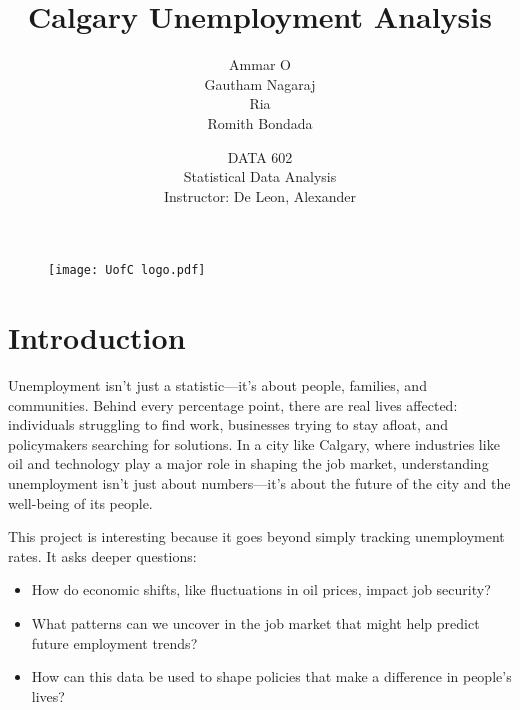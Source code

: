 \documentclass[11pt]{article}
\begin{document}
\title{
    \fontsize{24pt}{26pt}\textbf{Calgary Unemployment Analysis} 
}
\begin{figure}
    \centering
    \texttt{[image: UofC logo.pdf]} %
\end{figure}

\author{
    \vspace{0.5cm}
    \fontsize{20pt}{22pt}\selectfont Ammar O \\
    \vspace{0.5cm} %
    \fontsize{20pt}{22pt}\selectfont Gautham Nagaraj\\
    \vspace{0.5cm} %
    \fontsize{20pt}{22pt}\selectfont Ria  \\
    \vspace{0.5cm} %
    \fontsize{20pt}{22pt}\selectfont Romith Bondada
}
\date{
\vspace{0.5cm}
\fontsize{22pt}{24pt}\selectfont DATA 602\\
\vspace{0.25cm}
\fontsize{22pt}{24pt}\selectfont Statistical Data Analysis\\
\vspace{0.25cm}
\fontsize{22pt}{24pt}\selectfont Instructor: De Leon, Alexander
}

\maketitle
\newpage



\section{Introduction}
Unemployment isn’t just a statistic—it’s about people, families, and communities. Behind every percentage point, there are real lives affected: individuals struggling to find work, businesses trying to stay afloat, and policymakers searching for solutions. In a city like Calgary, where industries like oil and technology play a major role in shaping the job market, understanding unemployment isn’t just about numbers—it’s about the future of the city and the well-being of its people.

This project is interesting because it goes beyond simply tracking unemployment rates. It asks deeper questions:
\begin{itemize}
    \item How do economic shifts, like fluctuations in oil prices, impact job security?
    \item What patterns can we uncover in the job market that might help predict future employment trends?
    \item How can this data be used to shape policies that make a difference in people’s lives?
\end{itemize}
\end{document}
